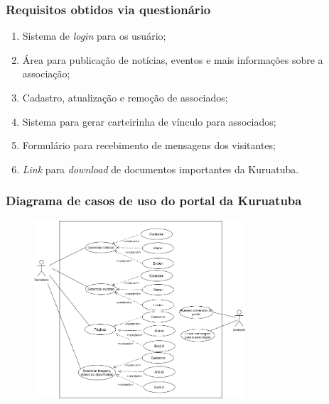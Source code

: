 \documentclass{beamer}
\begin{document}
\begin{frame}
    \frametitle{Requisitos obtidos via questionário} %
    \begin{enumerate}
     \item Sistema de \textit{login} para os usuário;
     \item Área para publicação de notícias, eventos e mais informações sobre a associação;
     \item Cadastro, atualização e remoção de associados;
     \item Sistema para gerar carteirinha de vínculo para associados;
     \item Formulário para recebimento de mensagens dos visitantes;
     \item \textit{Link} para \textit{download} de documentos importantes da Kuruatuba.
    \end{enumerate}

\end{frame}


\begin{frame}
    \frametitle{Diagrama de casos de uso do portal da Kuruatuba}
    \begin{figure}[htb]
        \centering
        
        \includegraphics[width=0.7\textwidth]{figuras/use-case-portal-1.png}
        
        \label{use-case-portal}
    \end{figure}
\end{frame}
\end{document}
